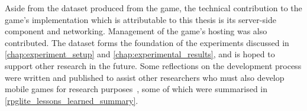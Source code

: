 Aside from the dataset produced from the game, the technical contribution to the
game's implementation which is attributable to this thesis is its server-side
component and networking. Management of the game's hosting was also contributed.
The dataset forms the foundation of the experiments discussed in
\cref{chap:experiment_setup} and \cref{chap:experimental_results}, and is hoped
to support other research in the future. Some reflections on the development
process were written and published to assist other researchers who must also
develop mobile games for research purposes~\cite{RPGLiteLessonsLearned}, some of
which were summarised in \cref{rpglite_lessons_learned_summary}.

